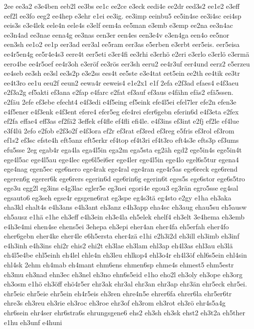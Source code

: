 {2ee
ee3a2
e3e4ben
eeb2l
ee3bs
ee1c
ee2ce
e3eck
eedi4e
ee2dr
eed3s2
ee1e2
e3eff
eef2l
ee3fo
eeg2
ee4hep
e3ehr
e1ei
ee3ig.
ee3imp
eeinbu5
ee5in4se
ee3i4sc
eei4sp
eeis3s
e3e4lek
eele4n
eele4s
e3elf
eem4a
ee5man
e3emb
e3emp
ee2na
ee3n4ac
ee3n4ad
ee3nae
eena4g
ee3nas
een3er
een4es
een3e4v
e3en4ga
een4o
ee5nor
een3sh
ee1o2
ee1p
eer3ad
eer3al
ee5ram
eer3as
e5erben
e3erbt
eer5eis.
eer5eisa
ee4r5en4g
ee5r4e4s3
eere4t
eer5eti
e3er4fi
ee3rhi
e3erhö
e2eri
e3erlo
e3erlö
e3ermä
eero4be
ee4r5oef
ee4r3oh
e3eröf
ee3rös
eer3sh
eeru2
ee4r3uf
eer4und
eerz2
e5erzeu
ee4seb
ee3sh
ee3sl
ee3s2p
e3e2ss
ees4t
ee5ste
e3e4tat
eet5ein
ee2th
ee4tik
ee3tr
ee4t3ro
ee1u
eeu2f
eeun2
eewa4r
eeweis4
e1e2x1
e1f
2efa
e2f3ad
efaes4
e4f3aeu
e2f3a2g
ef5akti
ef3ana
e2fap
e4farc
e2fat
ef3auf
ef3aus
e4fähn
efäs2
efä5ssen.
e2fäu
2efe
ef3ebe
efecht4
e4f3edi
e4f5eing
ef5eink
efe4l5ei
efel7ler
efe2n
efen3e
e4f5ener
e4f3enk
e4f3ent
efere4
efer5eg
efe4rei
efer6gebn
eferin6d
e4f3eta
e2fex
ef2fa
effae4
eff3as
ef2fä2
3effek
ef4fle
ef4fli
efi4le.
e4f3ins
ef3int
e2fj
ef2le
ef4lue
e3f4lü
2efo
e2fob
e2f3o2f
e4f3ora
ef2r
ef3rat
ef3red
ef3reg
e5fris
ef3rol
ef3rom
ef1s2
ef3sc
efste4h
eft5anz
eft5erkr
ef4top
ef4t3ri
ef4t3ro
eft4s3e
efts3p
ef3ums
efu5sse
2eg
egab4r
ega4la
ega4l5in
ega2m
ega5sta
eg2äh
egd2
ege5in4s
ege5in4t
ege4l5ac
ege4l5au
ege4lec
ege6l5ei6er
ege4ler
ege4l5in
ege4lo
egel6s5tur
egena4
ege4nag
egen5ec
ege6nero
ege4rak
ege4ral
ege4ran
ege4r5as
ege6reck
ege6rend
egeren6g
egerer6k
ege6rers
egerin6d
ege6rin6g
egerin6t
eges5s
ege6stor
ege6s5tro
ege3u
egg2l
eg3ins
e4g3lac
egler5e
eg3nei
egori4e
egou3
eg3rän
egro5sse
eg4sal
egsauto6
eg3seh
egse4r
egsgene6rat
eg3spe
eg4s3tä
eg4sto
e2gy
e1ha
eh3aka
eha3kl
ehalt4s
e4h3ans
e4h3ant
eh3anz
e4h3app
eha4sc
eh3aug
ehau5su
eh5ausw
eh5ausz
e1hä
e1he
eh3eff
e4h3ein
eh3e4la
eh5elek
ehelf4
eh3elt
3e4hema
eh3emb
e4h3e4mi
ehen4se
ehens5ei
3ehepa
eh3epi
eher4an
eher4fa
eh5erfah
eher4fo
eher6gebn
eher4ke
eher4le
e6h5ersta
eher4zä
e1hi
e2h3i2d
eh3ill
eh3imb
eh3inf
e4h3inh
e4h3ins
ehi2r
ehis2
ehi2t
eh3lae
eh3lam
ehl3ap
eh4l3as
ehl3au
eh3lä
eh4l5e4be
ehl5einh
eh4lel
ehle4n
eh3leu
ehlkop4
ehl3o4r
eh4l3öf
ehl6s5ein
ehl4sin
ehl4sk
2ehm
eh4mab
eh4mant
ehm6ens
ehmen6sp
ehme4s
ehmest5
ehm5estr
eh3mu
eh3nad
ehn3ec
eh3nel
eh3no
ehn6s5eid
e1ho
eho2l
eh3oly
eh3ope
eh3org
eh3osm
e1hö
eh3öff
ehö4r5er
ehr3ak
ehr3al
ehr3an
ehr3ap
ehr3än
ehr5eck
ehr5ei.
ehr5eic
ehr5eie
ehr5ein
eh4r5eis
eh3ren
ehre4n5e
ehrer6fa
ehrer6la
ehr5er6tr
ehre3s
eh3reu
eh3rie
eh3roc
eh3roe
ehr3of
eh3rom
eh3rot
eh3rö
ehr4s5a4g
ehr6sein
ehr4ser
ehr6stra6s
ehrungsgene6
ehs2
eh3sh
eh3sk
ehst2
eh3t2a
eh5ther
e1hu
eh3unf
e4huni
}

